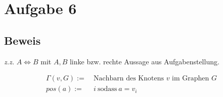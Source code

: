 \pagebreak

\setcounter{subsection}{0}

\section*{Aufgabe 6}
\label{sec:Aufgabe 6}

\subsection{Beweis}
\label{sub:Beweis}

\emph{z.z. } $A \Leftrightarrow B$ mit $A, B$ linke bzw. rechte Aussage aus Aufgabenstellung.

\begin{align*}
	\Gamma(v, G) :=&\ \text{Nachbarn des Knotens $v$ im Graphen $G$} \\
	pos(a) :=&\ i\ \text{sodass}\ a = v_i
\end{align*}

